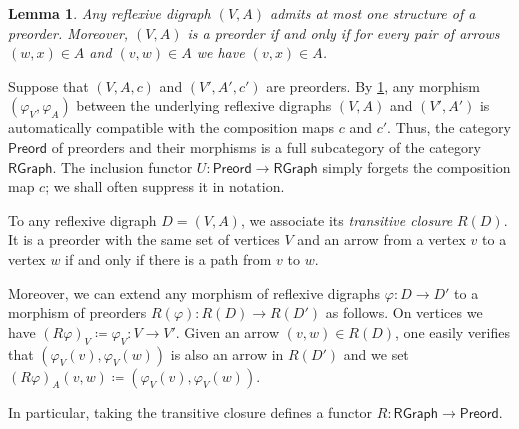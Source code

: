 \documentclass[12pt,dvipsnames,oneside]{amsart}
\theoremstyle{plain}
\newtheorem{lemma}[proposition]{Lemma}
\theoremstyle{remark}
\theoremstyle{definition}
\newcommand*{\from}{\colon}
\newcommand*{\eqdef}{\coloneqq}
\newcommand{\preord}{\mathsf{Preord}}
\newcommand{\rgraph}{\mathsf{RGraph}}
\newcommand{\forget}{U}
\newcommand*{\defeq}{\coloneqq}
\begin{document}
\begin{lemma}\label{lem:existence-and-uniqueness-of-preorders}
  Any reflexive digraph \((V,A)\) admits at most one structure of a preorder.
  Moreover, \((V,A)\) is a preorder if and only if for every pair of arrows
  \((w,x)\in A\) and \((v,w)\in A\) we have \((v,x)\in A\).
\end{lemma}



Suppose that \((V,A,c)\) and \((V',A', c')\) are preorders.
By \cref{lem:existence-and-uniqueness-of-preorders}, any morphism \((\varphi_{V}, \varphi_{A})\) between the underlying reflexive digraphs \((V,A)\) and \((V', A')\) is automatically compatible with the composition maps \(c\) and \(c'\).
Thus,  the category \(\preord\) of preorders and their morphisms is a full subcategory of the category \(\rgraph\).
The inclusion functor \(\forget \colon \preord \to \rgraph\) simply forgets the composition map \(c\);
we shall often suppress it in notation.

\begin{remark}\label{rmk:reflector}
  To any reflexive digraph \(D = (V,A)\), we associate its \emph{transitive closure} \(R(D)\).
  It is a preorder with the same set of vertices \(V\) and an arrow from a vertex \(v\) to a vertex \(w\) if and only if there is a path from \(v\) to \(w\).

  Moreover, we can extend any morphism of reflexive digraphs \(\varphi \colon D \to D'\) to a morphism of preorders \(R(\varphi) \from R(D) \to R(D')\) as follows.
  On vertices we have \((R\varphi)_{V} \defeq \varphi_{V} \from V \to V'\).
  Given an arrow \((v,w) \in R(D)\), one easily verifies that \((\varphi_{V}(v), \varphi_{V}(w))\) is also an arrow in \(R(D')\) and we set \((R\varphi)_{A}(v,w) \eqdef (\varphi_{V}(v), \varphi_{V}(w))\).

  In particular, taking the transitive closure defines a functor \(R \from \rgraph \to \preord\).
\end{remark}
\end{document}
